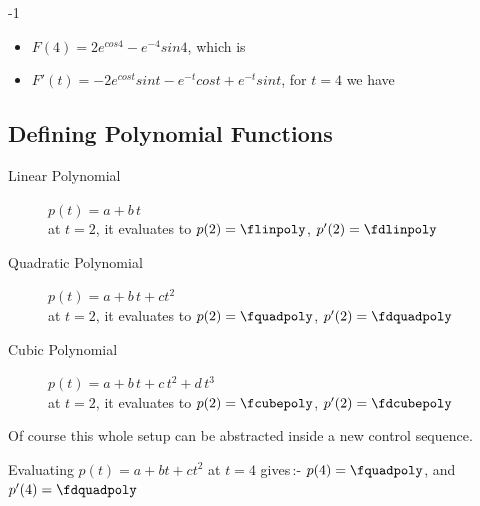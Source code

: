\documentclass{article}
\begin{document}
	\PRODUCTfunction{\Fexp}{\SINfunction}{\FunTwo}
	
	 			{-1}{\FunTwo}{\LinearComb}
	 \begin{itemize}
	 	\item $F(4) = 2e^{cos 4} - e^{-4}sin 4$,
	 		which is \FLinSol
	 	\item $F'(t)= -2e^{cos t}sin t - e^{-t}cos t +
	 		e^{-t}sin t$, for $t=4$ we have \DFLinSol
	 \end{itemize}
	 
	 \pagebreak
	 
	 \subsection{Defining Polynomial Functions}
	 \begin{description}
	 	\item[Linear Polynomial] 
	 		$p(t) = a + b\,t$ \\
	 		at $t=2$, it evaluates to $p(2)=\flinpoly$, 
			$p'(2)=\fdlinpoly$
		\item[Quadratic Polynomial] 
			$p(t) = a + b\,t + c t^2$ \\
			at $t=2$, it evaluates to $p(2)=\fquadpoly$, 
			$p'(2)=\fdquadpoly$
		\item[Cubic Polynomial] 
			$p(t) = a + b\,t + c\,t^2 + d\,t^3$ \\
			at $t=2$, it evaluates to $p(2)=\fcubepoly$, 
			$p'(2)=\fdcubepoly$
	 \end{description}
	 
	\noindent
	Of course this whole setup can be abstracted inside 
	a new control sequence. \\[3pt]
	\newcommand{\quadpoly}[4]{
		\newqpoly{\evquadpoly}{#1}{#2}{#3} %
		\evquadpoly{#4}{\fquadpoly}{\fdquadpoly}
		Evaluating $p(t)=a+bt+ct^2$ at $t=#4$ gives\,:-
		$p(#4)=\fquadpoly$, and $p'(#4)=\fdquadpoly$
	}
	\quadpoly{1}{2}{3}{4}
	
\end{document}

